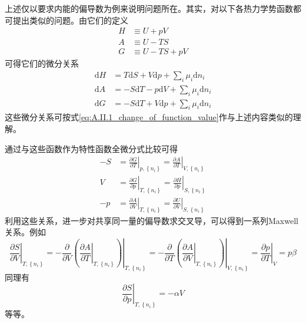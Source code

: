 \documentclass[main.tex]{subfiles}
\begin{document}
上述仅以要求内能的偏导数为例来说明问题所在。其实，对以下各热力学势函数都可提出类似的问题。由它们的定义
\begin{align}
    H & \equiv U+pV    \\
    A & \equiv U-TS    \\
    G & \equiv U-TS+pV
\end{align}
可得它们的微分关系
\begin{align}
    \mathrm{d}H & =T\mathrm{d}S+V\mathrm{d}p+\sum_i\mu_i\mathrm{d}n_i  \label{eq:A.II.1_derivative_H} \\
    \mathrm{d}A & =-S\mathrm{d}T-p\mathrm{d}V+\sum_i\mu_i\mathrm{d}n_i \label{eq:A.II.1_derivative_A} \\
    \mathrm{d}G & =-S\mathrm{d}T+V\mathrm{d}p+\sum_i\mu_i\mathrm{d}n_i\label{eq:A.II.1_derivative_G}
\end{align}
这些微分关系可按式\eqref{eq:A.II.1_change_of_function_value}作与上述内容类似的理解。

通过与这些函数作为特性函数全微分式比较可得
\begin{align}
    -S & =\left.\frac{\partial G}{\partial T}\right|_{p,\left\{n_i\right\}}=\left.\frac{\partial A}{\partial T}\right|_{V,\left\{n_i\right\}} \\
    V  & =\left.\frac{\partial G}{\partial p}\right|_{T,\left\{n_i\right\}}=\left.\frac{\partial H}{\partial p}\right|_{S,\left\{n_i\right\}} \\
    -p & =\left.\frac{\partial A}{\partial V}\right|_{T,\left\{n_i\right\}}=\left.\frac{\partial U}{\partial V}\right|_{S,\left\{n_i\right\}}
\end{align}
利用这些关系，进一步对共享同一量的偏导数求交叉导，可以得到一系列Maxwell关系。例如
\[\left.\frac{\partial S}{\partial V}\right|_{T,\left\{n_i\right\}}=-\left.\frac{\partial}{\partial V}\left(\left.\frac{\partial A}{\partial T}\right|_{T,\left\{n_i\right\}}\right)\right|_{T,\left\{n_i\right\}}=-\left.\frac{\partial}{\partial T}\left(\left.\frac{\partial A}{\partial V}\right|_{T,\left\{n_i\right\}}\right)\right|_{V,\left\{n_i\right\}}=\left.\frac{\partial p}{\partial T}\right|_{V}=p\beta\]
同理有
\[\left.\frac{\partial S}{\partial p}\right|_{T,\left\{n_i\right\}}=-\alpha V\]
等等。
\end{document}
